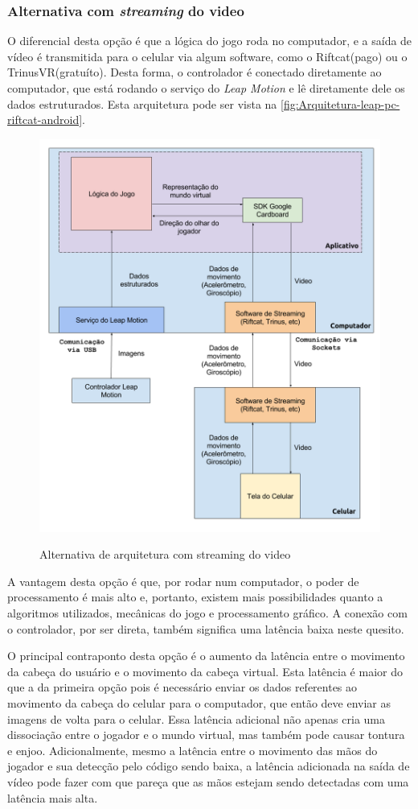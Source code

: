 \subsubsection{Alternativa com \textit{streaming} do video}\label{subsubsec-arquiteturas-leapmotion-pc-riftcat-android}

O diferencial desta opção é que a lógica do jogo roda no computador, e a saída 
de vídeo é transmitida para o celular via algum software, como o Riftcat(pago) ou
o TrinusVR(gratuíto). Desta forma, o controlador é conectado diretamente 
ao computador, que está rodando o serviço do \textit{Leap Motion} e lê 
diretamente dele os dados estruturados. Esta arquitetura pode ser vista 
na \autoref{fig:Arquitetura-leap-pc-riftcat-android}.

\begin{figure}[ht]
	\centering
	\caption{Alternativa de arquitetura com streaming do video}
	\includegraphics[width=0.7\linewidth]{images/Arquitetura-leap-pc-riftcat-android}
	\legend{\fonteAP}
	\label{fig:Arquitetura-leap-pc-riftcat-android}
\end{figure}

A vantagem desta opção é que, por rodar num computador, o poder de 
processamento é mais alto e, portanto, existem mais possibilidades quanto
a algoritmos utilizados, mecânicas do jogo e processamento gráfico. A conexão 
com o controlador, por ser direta, também significa uma latência baixa 
neste quesito. 

O principal contraponto desta opção é o aumento da latência entre o movimento 
da cabeça do usuário e o movimento da cabeça virtual. Esta latência é maior do 
que a da primeira opção pois é necessário enviar os dados referentes ao movimento 
da cabeça do celular para o computador, que então deve enviar as imagens de 
volta para o celular. Essa latência adicional não apenas cria uma dissociação 
entre o jogador e o mundo virtual, mas também pode causar tontura e enjoo.
Adicionalmente, mesmo a latência entre o movimento das mãos do jogador e
sua detecção pelo código sendo baixa, a latência adicionada na saída de vídeo
pode fazer com que pareça que as mãos estejam sendo detectadas com uma latência 
mais alta.

